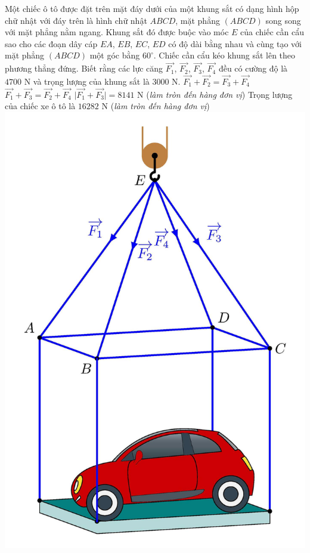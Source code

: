 \begin{ex}
	\immini
	{
	Một chiếc ô tô được đặt trên mặt đáy dưới của một khung sắt có dạng hình hộp chữ nhật với đáy trên là hình chữ nhật $ABCD$, mặt phẳng $(ABCD)$ song song với mặt phẳng nằm ngang. Khung sắt đó được buộc vào móc $E$ của chiếc cần cẩu sao cho các đoạn dây cáp $EA$, $EB$, $EC$, $ED$ có độ dài bằng nhau và cùng tạo với mặt phẳng $(ABCD)$ một góc bằng $60^\circ$. Chiếc cần cẩu kéo khung sắt lên theo phương thẳng đứng. Biết rằng các lực căng $\vec{F_1}$, $\vec{F_2}$, $\vec{F_3}$, $\vec{F_4}$ đều có cường độ là $4700$ N và trọng lượng của khung sắt là $3000$ N.
	\choiceTF
	{$\vec{F_1}+\vec{F_2}=\vec{F_3}+\vec{F_4}$}
	{\True $\vec{F_1}+\vec{F_3}=\vec{F_2}+\vec{F_4}$}
	{\True $\big|\vec{F_1}+\vec{F_3}\big|=8141$ N (\textit{làm tròn đến hàng đơn vị})}
	{Trọng lượng của chiếc xe ô tô là $16282$ N (\textit{làm tròn đến hàng đơn vị})}
	}
	{\hspace{1cm}
	\includegraphics[scale=.09]{datak40/2D2-1/xe-1.jpg}
}
\end{ex}
